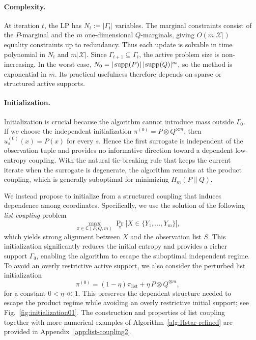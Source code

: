 \documentclass[journal]{IEEEtran}
\def\supp{\mathop{\rm supp}}
\newcommand{\1}{\mathbf{1}}
\begin{document}
\paragraph{Complexity.}
At iteration \(t\), the LP has \(N_t:=|\Gamma_t|\) variables. The marginal
constraints consist of the \(P\)-marginal and the \(m\) one-dimensional
\(Q\)-marginals, giving \(O(m|\mathcal X|)\) equality constraints up to
redundancy. Thus each update is solvable in time polynomial in \(N_t\) and
\(m|\mathcal X|\). Since \(\Gamma_{t+1}\subseteq\Gamma_t\), the active problem
size is non-increasing. In the worst case,
\(N_0=|\supp(P)|\,|\supp(Q)|^m,\)
so the method is exponential in \(m\). Its practical usefulness therefore
depends on sparse or structured active supports.

\paragraph{Initialization.}
Initialization is crucial because the algorithm cannot introduce mass outside
\(\Gamma_0\). 
If we choose the independent initialization
\(\pi^{(0)}=P\otimes Q^{\otimes m}\), then
\(u_s^{(0)}(x)=P(x)\) for every \(s\). Hence the first surrogate is
independent of the observation tuple and provides no informative direction
toward a dependent low-entropy coupling. With the natural tie-breaking rule
that keeps the current iterate when the surrogate is degenerate, the algorithm
remains at the product coupling, which is generally suboptimal for minimizing
\(H_m(P\|Q)\).

We instead propose to initialize from a structured coupling that induces dependence among coordinates. Specifically, we use the solution of the following \textit{list coupling} problem
\begin{equation}\label{eq:listcoupling}
    \max_{\pi\in\mathsf C(P,Q,m)} \Pr_\pi\bigl[X\in\{Y_1,\dots,Y_m\}\bigr],
\end{equation}
which yields strong alignment between $X$ and the observation list  $S$. This initialization significantly reduces the initial entropy and provides a richer support $\Gamma_0$, enabling the algorithm to escape the suboptimal independent regime.  To avoid an overly restrictive active support, we also consider the perturbed list initialization
\begin{equation}\label{eq:listcouplingMixture}
    \pi^{(0)}=(1-\eta)\pi_{\mathrm{list}}+\eta\,P\otimes Q^{\otimes m}, 
\end{equation}
for a constant $0<\eta\ll1$. 
This preserves the dependent structure needed to escape the product regime while avoiding an overly restrictive initial support; see Fig.~\ref{fig:initialization01}. 
The construction and properties of list coupling together with more numerical examples of Algorithm~\ref{alg:Hstar-refined} are provided in Appendix~\ref{app:list-coupling2}.
\end{document}
